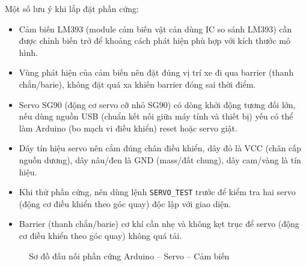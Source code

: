 \documentclass[a4paper,14pt]{extreport}
\begin{document}
Một số lưu ý khi lắp đặt phần cứng:

\begin{itemize}[leftmargin=2em]
  \item Cảm biến LM393 (module cảm biến vật cản dùng IC so sánh LM393) cần được chỉnh biến trở để khoảng cách phát hiện phù hợp với kích thước mô hình.
  \item Vùng phát hiện của cảm biến nên đặt đúng vị trí xe đi qua barrier (thanh chắn/barie), không đặt quá xa khiến barrier đóng sai thời điểm.
  \item Servo SG90 (động cơ servo cỡ nhỏ SG90) có dòng khởi động tương đối lớn, nếu dùng nguồn USB (chuẩn kết nối giữa máy tính và thiết bị) yếu có thể làm Arduino (bo mạch vi điều khiển) reset hoặc servo giật.
  \item Dây tín hiệu servo nên cắm đúng chân điều khiển, dây đỏ là VCC (chân cấp nguồn dương), dây nâu/đen là GND (mass/đất chung), dây cam/vàng là tín hiệu.
  \item Khi thử phần cứng, nên dùng lệnh \texttt{SERVO\_TEST} trước để kiểm tra hai servo (động cơ điều khiển theo góc quay) độc lập với giao diện.
  \item Barrier (thanh chắn/barie) cơ khí cần nhẹ và không kẹt trục để servo (động cơ điều khiển theo góc quay) không quá tải.
\end{itemize}

\begin{figure}[H]
\centering
{}
\caption{Sơ đồ đấu nối phần cứng Arduino -- Servo -- Cảm biến}
\label{fig:phan_cung}
\end{figure}
\end{document}
